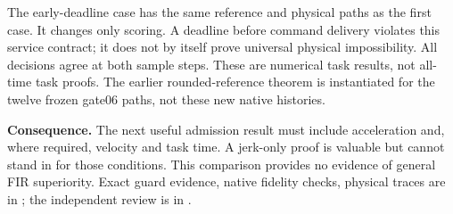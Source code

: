 The early-deadline case has the same reference and physical paths as the first
case. It changes only scoring. A deadline before command delivery violates this
service contract; it does not by itself prove universal physical impossibility.
All decisions agree at both sample steps. These are numerical task results,
not all-time task proofs. The earlier rounded-reference theorem is instantiated
for the twelve frozen gate06 paths, not these new native histories.

\textbf{Consequence.} The next useful admission result must include acceleration
and, where required, velocity and task time. A jerk-only proof is valuable but
cannot stand in for those conditions. This comparison provides no evidence of
general FIR superiority. Exact guard evidence, native fidelity checks, physical
traces are in ; the independent review is in
.

